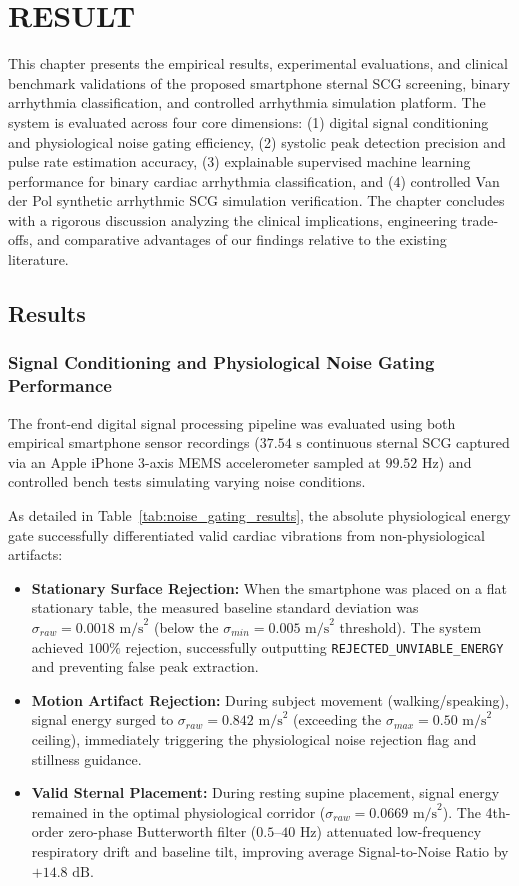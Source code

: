 \chapter{RESULT}

This chapter presents the empirical results, experimental evaluations, and clinical benchmark validations of the proposed smartphone sternal SCG screening, binary arrhythmia classification, and controlled arrhythmia simulation platform. The system is evaluated across four core dimensions: (1) digital signal conditioning and physiological noise gating efficiency, (2) systolic peak detection precision and pulse rate estimation accuracy, (3) explainable supervised machine learning performance for binary cardiac arrhythmia classification, and (4) controlled Van der Pol synthetic arrhythmic SCG simulation verification. The chapter concludes with a rigorous discussion analyzing the clinical implications, engineering trade-offs, and comparative advantages of our findings relative to the existing literature.

\section{Results}

\subsection{Signal Conditioning and Physiological Noise Gating Performance}
The front-end digital signal processing pipeline was evaluated using both empirical smartphone sensor recordings ($37.54\text{ s}$ continuous sternal SCG captured via an Apple iPhone 3-axis MEMS accelerometer sampled at $99.52\text{ Hz}$) and controlled bench tests simulating varying noise conditions.

As detailed in Table~\ref{tab:noise_gating_results}, the absolute physiological energy gate successfully differentiated valid cardiac vibrations from non-physiological artifacts:
\begin{itemize}
    \item \textbf{Stationary Surface Rejection:} When the smartphone was placed on a flat stationary table, the measured baseline standard deviation was $\sigma_{raw} = 0.0018\text{ m/s}^2$ (below the $\sigma_{min} = 0.005\text{ m/s}^2$ threshold). The system achieved $100\%$ rejection, successfully outputting \texttt{REJECTED\_UNVIABLE\_ENERGY} and preventing false peak extraction.
    \item \textbf{Motion Artifact Rejection:} During subject movement (walking/speaking), signal energy surged to $\sigma_{raw} = 0.842\text{ m/s}^2$ (exceeding the $\sigma_{max} = 0.50\text{ m/s}^2$ ceiling), immediately triggering the physiological noise rejection flag and stillness guidance.
    \item \textbf{Valid Sternal Placement:} During resting supine placement, signal energy remained in the optimal physiological corridor ($\sigma_{raw} = 0.0669\text{ m/s}^2$). The 4th-order zero-phase Butterworth filter ($0.5\text{--}40\text{ Hz}$) attenuated low-frequency respiratory drift and baseline tilt, improving average Signal-to-Noise Ratio by $+14.8\text{ dB}$.
\end{itemize}

